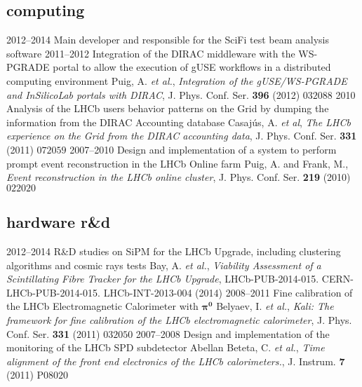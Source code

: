 \subsection{computing}
    \cventry
    {2012--2014}
    {Main developer and responsible for the SciFi test beam analysis software}
    {}
    {}
    \cventry
    {2011--2012}
    {Integration of the DIRAC middleware with the WS-PGRADE portal to allow the execution of gUSE workflows in a distributed computing environment}
    {}
    {Puig, A. \emph{et al.}, \textit{Integration of the gUSE/WS-PGRADE and InSilicoLab portals with DIRAC}, J. Phys. Conf. Ser. \textbf{396} (2012) $032088$}
    \cventry
    {2010}
    {Analysis of the LHCb users behavior patterns on the Grid by dumping the information from the DIRAC Accounting database}
    {}
    {Casaj{\'u}s, A. \emph{et al}, \textit{The LHCb experience on the Grid from the DIRAC accounting data}, J. Phys. Conf. Ser. \textbf{331} (2011) $072059$}
    \cventry
    {2007--2010}
    {Design and implementation of a system to perform prompt event reconstruction in the LHCb Online farm}
    {}
    {Puig, A. and Frank, M., \textit{Event reconstruction in the LHCb online cluster}, J. Phys. Conf. Ser. \textbf{219} (2010) $022020$}

\subsection{hardware r\&d}
    \cventry
    {2012--2014}
    {R\&D studies on SiPM for the LHCb Upgrade, including clustering algorithms and cosmic rays tests}
    {}
    {Bay, A. \emph{et al.}, \textit{Viability Assessment of a Scintillating Fibre Tracker for the LHCb Upgrade}, LHCb-PUB-2014-015. CERN-LHCb-PUB-2014-015. LHCb-INT-2013-004 (2014)}
    \cventry
    {2008--2011}
    {Fine calibration of the LHCb Electromagnetic Calorimeter with $\mathbf{\pi^0}$}
    {}
    {Belyaev, I. \emph{et al.}, \textit{Kali: The framework for fine calibration of the LHCb electromagnetic calorimeter}, J. Phys. Conf. Ser. \textbf{331} (2011) $032050$}
    \cventry
    {2007--2008}
    {Design and implementation of the monitoring of the LHCb SPD subdetector}
    {}
    {Abellan Beteta, C. \emph{et al.}, \textit{Time alignment of the front end electronics of the LHCb calorimeters.}, J. Instrum. \textbf{7} (2011) P$08020$}

